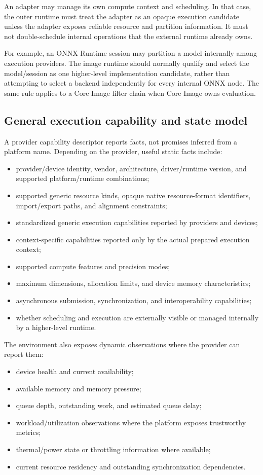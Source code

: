 \documentclass[11pt,a4paper,oneside]{article}
\begin{document}
An adapter may manage its own compute context and scheduling. In that case, the outer runtime must treat the adapter as an opaque execution candidate unless the adapter exposes reliable resource and partition information. It must not double-schedule internal operations that the external runtime already owns.

For example, an ONNX Runtime session may partition a model internally among execution providers. The image runtime should normally qualify and select the model/session as one higher-level implementation candidate, rather than attempting to select a backend independently for every internal ONNX node. The same rule applies to a Core Image filter chain when Core Image owns evaluation.

\subsection{General execution capability and state model}

A provider capability descriptor reports facts, not promises inferred from a platform name. Depending on the provider, useful static facts include:
\begin{itemize}
  \item provider/device identity, vendor, architecture, driver/runtime version, and supported platform/runtime combinations;
  \item supported generic resource kinds, opaque native resource-format identifiers, import/export paths, and alignment constraints;
  \item standardized generic execution capabilities reported by providers and devices;
  \item context-specific capabilities reported only by the actual prepared execution context;
  \item supported compute features and precision modes;
  \item maximum dimensions, allocation limits, and device memory characteristics;
  \item asynchronous submission, synchronization, and interoperability capabilities;
  \item whether scheduling and execution are externally visible or managed internally by a higher-level runtime.
\end{itemize}

The environment also exposes dynamic observations where the provider can report them:
\begin{itemize}
  \item device health and current availability;
  \item available memory and memory pressure;
  \item queue depth, outstanding work, and estimated queue delay;
  \item workload/utilization observations where the platform exposes trustworthy metrics;
  \item thermal/power state or throttling information where available;
  \item current resource residency and outstanding synchronization dependencies.
\end{itemize}
\end{document}

